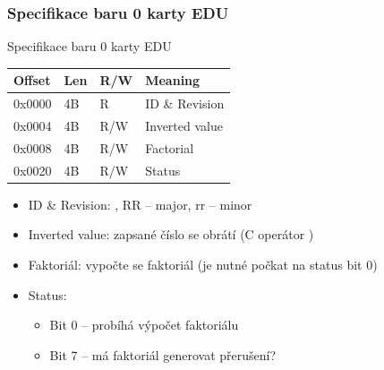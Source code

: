 
\begin{frame}
  \frametitle{Specifikace baru 0 karty EDU}

\begin{block}{Specifikace baru 0 karty EDU}
\begin{center}
\begin{tabular}{|l|l|l|l|} \hline
Offset & Len & R/W & Meaning \\ \hline\hline
0x0000 & 4B  & R   & ID \& Revision \\ \hline
0x0004 & 4B  & R/W & Inverted value \\ \hline
0x0008 & 4B  & R/W & Factorial \\ \hline
0x0020 & 4B  & R/W & Status    \\ \hline
\end{tabular}
\end{center}
\end{block}

  \begin{itemize}
    \item ID \& Revision: , RR -- major, rr -- minor
    \item Inverted value: zapsané číslo se obrátí (C operátor \code{\~})
    \item Faktoriál: vypočte se faktoriál (je nutné počkat na status bit 0)
    \item Status:
    \begin{itemize}
      \item Bit 0 -- probíhá výpočet faktoriálu
      \item Bit 7 -- má faktoriál generovat přerušení?
    \end{itemize}
  \end{itemize}

\end{frame}

